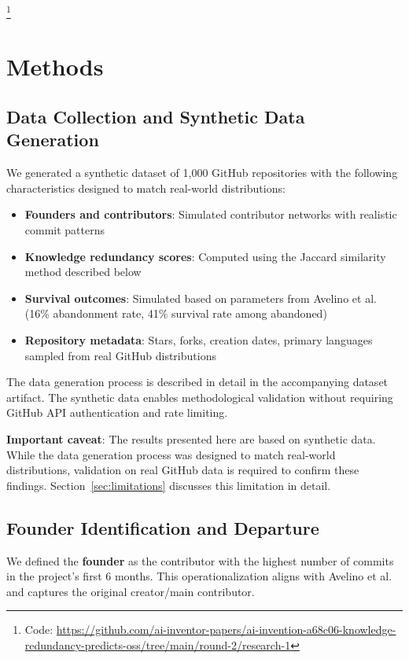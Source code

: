 \documentclass[11pt,letterpaper]{article}
\begin{document}
\footnote{Code: \url{https://github.com/ai-inventor-papers/ai-invention-a68c06-knowledge-redundancy-predicts-oss/tree/main/round-2/research-1}}

\section{Methods}

\subsection{Data Collection and Synthetic Data Generation}

We generated a synthetic dataset of 1,000 GitHub repositories with the following characteristics designed to match real-world distributions:

\begin{itemize}
    \item \textbf{Founders and contributors}: Simulated contributor networks with realistic commit patterns
    \item \textbf{Knowledge redundancy scores}: Computed using the Jaccard similarity method described below
    \item \textbf{Survival outcomes}: Simulated based on parameters from Avelino et al. \cite{Avelino2019} (16\% abandonment rate, 41\% survival rate among abandoned)
    \item \textbf{Repository metadata}: Stars, forks, creation dates, primary languages sampled from real GitHub distributions
\end{itemize}

The data generation process is described in detail in the accompanying dataset artifact. The synthetic data enables methodological validation without requiring GitHub API authentication and rate limiting.

\textbf{Important caveat}: The results presented here are based on synthetic data. While the data generation process was designed to match real-world distributions, validation on real GitHub data is required to confirm these findings. Section~\ref{sec:limitations} discusses this limitation in detail.

\subsection{Founder Identification and Departure}

We defined the \textbf{founder} as the contributor with the highest number of commits in the project's first 6 months. This operationalization aligns with Avelino et al. \cite{Avelino2019} and captures the original creator/main contributor.
\end{document}
